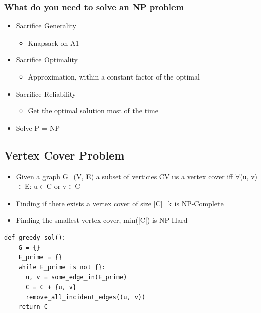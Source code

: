 \documentclass[11pt]{article}
\begin{document}
\subsubsection*{What do you need to solve an NP problem}
\label{sec:orgfaffd1b}
\begin{itemize}
\item Sacrifice Generality
\begin{itemize}
\item Knapsack on A1
\end{itemize}
\item Sacrifice Optimality
\begin{itemize}
\item Approximation, within a constant factor of the optimal
\end{itemize}
\item Sacrifice Reliability
\begin{itemize}
\item Get the optimal solution most of the time
\end{itemize}
\item Solve P = NP
\end{itemize}
\subsection*{Vertex Cover Problem}
\label{sec:org25e5b16}
\begin{itemize}
\item Given a graph G=(V, E) a subset of verticies C\subseteq{}V us a vertex cover iff \(\forall\)(u, v)\(\in\)E: u\(\in\)C or v\(\in\)C
\item Finding if there exists a vertex cover of size |C|=k is NP-Complete
\item Finding the smallest vertex cover, min(|C|) is NP-Hard
\end{itemize}
\begin{verbatim}
def greedy_sol():
    G = {}
    E_prime = {}
    while E_prime is not {}:
      u, v = some_edge_in(E_prime)
      C = C + {u, v}
      remove_all_incident_edges((u, v))
    return C
\end{verbatim}
\end{document}
